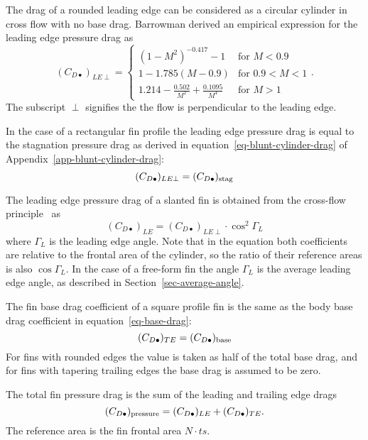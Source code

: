 The drag of a rounded leading edge can be considered as a circular
cylinder in cross flow with no base drag.  Barrowman derived 
an empirical expression for the leading edge pressure drag as
%
\begin{equation}
(C_{D\bullet})_{LE\perp} = 
\left\{ 
\begin{array}{ll}
  (1-M^2)^{-0.417} - 1 & \mbox{for $M<0.9$} \\
  1-1.785(M-0.9)         & \mbox{for $0.9 < M < 1$} \\
  1.214 - \frac{0.502}{M^2} + \frac{0.1095}{M^4} & \mbox{for $M>1$}
\end{array}
  \right. .
\end{equation}
%
The subscript $\perp$ signifies the the flow is perpendicular to the
leading edge.

In the case of a rectangular fin profile the leading edge pressure
drag is equal to the stagnation pressure drag as derived in 
equation~\ref{eq-blunt-cylinder-drag} of
Appendix~\ref{app-blunt-cylinder-drag}:
\begin{equation}
(C_{D\bullet})_{LE\perp} = (C_{D\bullet})_{\rm stag}
\end{equation}

The leading edge pressure drag of a slanted fin is obtained from the
cross-flow principle~\cite[p.~3-11]{hoerner} as
%
\begin{equation}
(C_{D\bullet})_{LE} = (C_{D\bullet})_{LE\perp} \cdot \cos^2\Gamma_L
\end{equation}
%
where $\Gamma_L$ is the leading edge angle.  Note that in the equation
both coefficients are relative to the frontal area of the cylinder, so
the ratio of their reference areas is also $\cos\Gamma_L$.  In the
case of a free-form fin the angle $\Gamma_L$ is the average leading
edge angle, as described in Section~\ref{sec-average-angle}.

The fin base drag coefficient of a square profile fin is the same as
the body base drag coefficient in equation~\ref{eq-base-drag}:
%
\begin{equation}
(C_{D\bullet})_{TE} = (C_{D\bullet})_{\rm base}
\end{equation}
%
For fins with rounded edges the value is taken as half of the total
base drag, and for fins with tapering trailing edges the base
drag is assumed to be zero.

The total fin pressure drag is the sum of the leading and trailing
edge drags
%
\begin{equation}
(C_{D\bullet})_{\rm pressure} = 
(C_{D\bullet})_{LE} + (C_{D\bullet})_{TE}.
\end{equation}
%
The reference area is the fin frontal area $N\cdot ts$.

